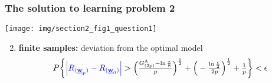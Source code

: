 


\begin{frame}\frametitle{The solution to learning problem 2} 
	\begin{center}
		\texttt{[image: img/section2\_fig1\_question1]}
	\end{center}
	\begin{enumerate}\setcounter{enumi}{1}
		\item \textbf{finite samples:} deviation from the optimal model
			\vspace{-2mm}
			\begin{equation}
				P\bigg\{ {%
				{\color{blue}\Big| R_{(\vec w_p)} - R_{(\vec w_0)} \Big|} }
					> \Big(\smallfrac{G^\Lambda_{(2p)} 
						- \ln \frac{\epsilon}{8}}{p} \Big)^\frac{1}{2}
					+ \Big(-\smallfrac{\ln \frac{\epsilon}{2}}{2p} 
						\Big)^\frac{1}{2} + \smallfrac{1}{p}
				\bigg\} < \epsilon
					\label{eq:boundgenerlizationdeviation}
			\end{equation}
			\vspace{-4mm}
	\end{enumerate}
\end{frame}



